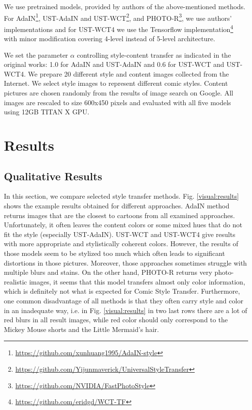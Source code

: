 \documentclass{llncs}
\begin{document}
We use pretrained models, provided by authors of the above-mentioned methods. For AdaIN\footnote{\url{https://github.com/xunhuang1995/AdaIN-style}}, UST-AdaIN and UST-WCT\footnote{\url{https://github.com/Yijunmaverick/UniversalStyleTransfer}}, and PHOTO-R\footnote{\url{https://github.com/NVIDIA/FastPhotoStyle}}, we use authors' implementations and for UST-WCT4 we use the Tensorflow implementation\footnote{\url{https://github.com/eridgd/WCT-TF}} with minor modification covering 4-level instead of 5-level architecture.%

We set the parameter $\alpha$ controlling style-content transfer as indicated in the original works: 1.0 for AdaIN and UST-AdaIN and 0.6 for UST-WCT and UST-WCT4. We prepare 20 different style and content images collected from the Internet. We select style images to represent different comic styles. Content pictures are chosen randomly from the results of image search on Google. All images are rescaled to size 600x450 pixels and evaluated with all five models using 12GB TITAN X GPU.
\section{Results}
\subsection{Qualitative Results}

In this section, we compare selected style transfer methods. Fig. \ref{visual:results} shows the example results obtained for different approaches. AdaIN method returns images that are the closest to cartoons from all examined approaches. Unfortunately, it often leaves the content colors or some mixed hues that do not fit the style (especially UST-AdaIN). UST-WCT and UST-WCT4 give results with more appropriate and stylistically coherent colors. However, the results of those models seem to be stylized too much which often leads to significant distortions in those pictures. Moreover, those approaches sometimes struggle with multiple blurs and stains. On the other hand,  PHOTO-R returns very photo-realistic images, it seems that this model transfers almost only color information, which is definitely not what is expected for Comic Style Transfer. Furthermore, one common disadvantage of all methods is that they often carry style and color in an inadequate way, i.e. in Fig. \ref{visual:results} in two last rows there are a lot of red blurs in all result images, while red color should only correspond to the Mickey Mouse shorts and the Little Mermaid's hair.
\end{document}
